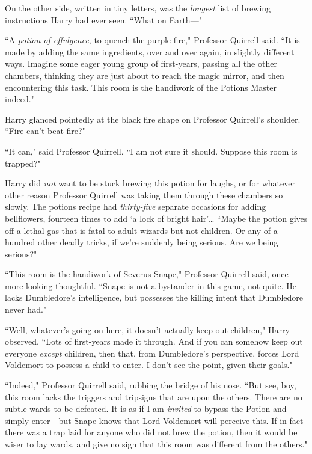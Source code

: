 On the other side, written in tiny letters, was the \emph{longest} list of brewing instructions Harry had ever seen. ``What on Earth---"

``A \emph{potion of effulgence}, to quench the purple fire," Professor Quirrell said. ``It is made by adding the same ingredients, over and over again, in slightly different ways. Imagine some eager young group of first-years, passing all the other chambers, thinking they are just about to reach the magic mirror, and then encountering this task. This room is the handiwork of the Potions Master indeed."

Harry glanced pointedly at the black fire shape on Professor Quirrell's shoulder. ``Fire can't beat fire?"

``It can," said Professor Quirrell. ``I am not sure it should. Suppose this room is trapped?"

Harry did \emph{not} want to be stuck brewing this potion for laughs, or for whatever other reason Professor Quirrell was taking them through these chambers so slowly. The potions recipe had \emph{thirty-five} separate occasions for adding bellflowers, fourteen times to add `a lock of bright hair'{\ldots} ``Maybe the potion gives off a lethal gas that is fatal to adult wizards but not children. Or any of a hundred other deadly tricks, if we're suddenly being serious. Are we being serious?"

``This room is the handiwork of Severus Snape," Professor Quirrell said, once more looking thoughtful. ``Snape is not a bystander in this game, not quite. He lacks Dumbledore's intelligence, but possesses the killing intent that Dumbledore never had."

``Well, whatever's going on here, it doesn't actually keep out children," Harry observed. ``Lots of first-years made it through. And if you can somehow keep out everyone \emph{except} children, then that, from Dumbledore's perspective, forces Lord Voldemort to possess a child to enter. I don't see the point, given their goals."

``Indeed," Professor Quirrell said, rubbing the bridge of his nose. ``But see, boy, this room lacks the triggers and tripsigns that are upon the others. There are no subtle wards to be defeated. It is as if I am \emph{invited} to bypass the Potion and simply enter---but Snape knows that Lord Voldemort will perceive this. If in fact there was a trap laid for anyone who did not brew the potion, then it would be wiser to lay wards, and give no sign that this room was different from the others."

